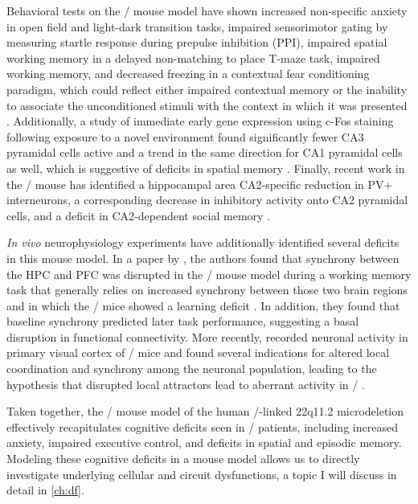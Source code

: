 Behavioral tests on the \df/ mouse model have shown increased non-specific anxiety in open field and light-dark transition tasks, impaired sensorimotor gating by measuring startle response during prepulse inhibition (PPI), impaired spatial working memory in a delayed non-matching to place T-maze task, impaired working memory, and decreased freezing in a contextual fear conditioning paradigm, which could reflect either impaired contextual memory or the inability to associate the unconditioned stimuli with the context in which it was presented \citep{Drew2011b, Stark2008, Sigurdsson2010}.
Additionally, a study of immediate early gene expression using c-Fos staining following exposure to a novel environment found significantly fewer CA3 pyramidal cells active and a trend in the same direction for CA1 pyramidal cells as well, which is suggestive of deficits in spatial memory \citep{Drew2011b}.
Finally, recent work in the \df/ mouse has identified a hippocampal area CA2-specific reduction in PV+ interneurons, a corresponding decrease in inhibitory activity onto CA2 pyramidal cells, and a deficit in CA2-dependent social memory \citep{Piskorowski2016}.

\emph{In vivo} neurophysiology experiments have additionally identified several deficits in this mouse model.
In a paper by \citeauthor{Sigurdsson2010}, the authors found that synchrony between the \ac{HPC} and \ac{PFC} was disrupted in the \df/ mouse model during a working memory task that generally relies on increased synchrony between those two brain regions and in which the \df/ mice showed a learning deficit \citep{Sigurdsson2010}.
In addition, they found that baseline synchrony predicted later task performance, suggesting a basal disruption in functional connectivity.
More recently, \citeauthor{Hamm2017} recorded neuronal activity in primary visual cortex of \df/ mice and found several indications for altered local coordination and synchrony among the neuronal population, leading to the hypothesis that disrupted local attractors lead to aberrant activity in \scz/ \citep{Hamm2017}.

Taken together, the \df/ mouse model of the human \scz/-linked 22q11.2 microdeletion effectively recapitulates cognitive deficits seen in \scz/ patients, including increased anxiety, impaired executive control, and deficits in spatial and episodic memory.
Modeling these cognitive deficits in a mouse model allows us to directly investigate underlying cellular and circuit dysfunctions, a topic I will discuss in detail in \autoref{ch:df}.

